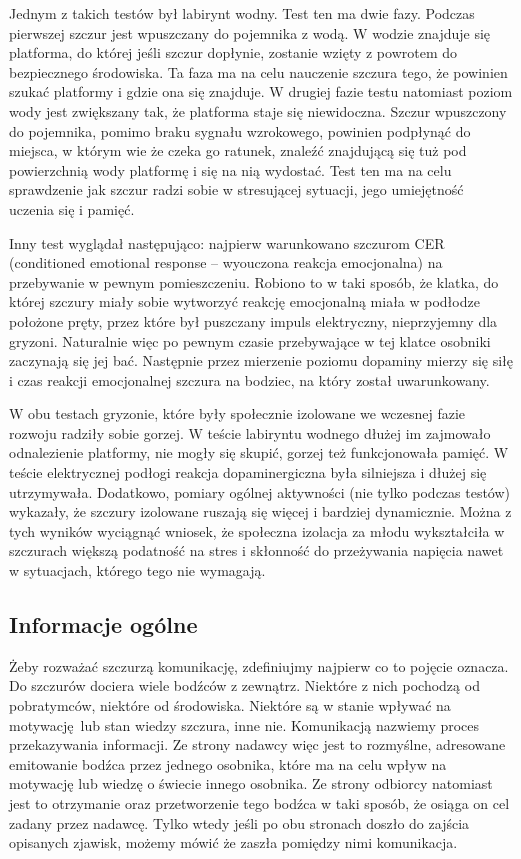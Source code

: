 \documentclass{psychol}
\begin{document}
Jednym z takich testów był labirynt wodny. Test ten ma dwie fazy. Podczas pierwszej szczur jest wpuszczany do pojemnika z wodą. W wodzie znajduje się platforma, do której jeśli szczur dopłynie, zostanie wzięty z powrotem do bezpiecznego środowiska. Ta faza ma na celu nauczenie szczura tego, że powinien szukać platformy i gdzie ona się znajduje. W drugiej fazie testu natomiast poziom wody jest zwiększany tak, że platforma staje się niewidoczna. Szczur wpuszczony do pojemnika, pomimo braku sygnału wzrokowego, powinien podpłynąć do miejsca, w którym wie że czeka go ratunek, znaleźć znajdującą się tuż pod powierzchnią wody platformę i się na nią wydostać. Test ten ma na celu sprawdzenie jak szczur radzi sobie w stresującej sytuacji, jego umiejętność uczenia się i pamięć.

Inny test wyglądał następująco: najpierw warunkowano szczurom CER (conditioned emotional response -- wyouczona reakcja emocjonalna) na przebywanie w pewnym pomieszczeniu. Robiono to w taki sposób, że klatka, do której szczury miały sobie wytworzyć reakcję emocjonalną miała w podłodze położone pręty, przez które był puszczany impuls elektryczny, nieprzyjemny dla gryzoni. Naturalnie więc po pewnym czasie przebywające w tej klatce osobniki zaczynają się jej bać. Następnie przez mierzenie poziomu dopaminy mierzy się siłę i czas reakcji emocjonalnej szczura na bodziec, na który został uwarunkowany.

W obu testach gryzonie, które były społecznie izolowane we wczesnej fazie rozwoju radziły sobie gorzej. W teście labiryntu wodnego dłużej im zajmowało odnalezienie platformy, nie mogły się skupić, gorzej też funkcjonowała pamięć. W teście elektrycznej podłogi reakcja dopaminergiczna była silniejsza i dłużej się utrzymywała. Dodatkowo, pomiary ogólnej aktywności (nie tylko podczas testów) wykazały, że szczury izolowane ruszają się więcej i bardziej dynamicznie. Można z tych wyników wyciągnąć wniosek, że społeczna izolacja za młodu wykształciła w szczurach większą podatność na stres i skłonność do przeżywania napięcia nawet w sytuacjach, którego tego nie wymagają.


\subsection{Informacje ogólne}

Żeby rozważać szczurzą komunikację, zdefiniujmy najpierw co to pojęcie oznacza. Do szczurów dociera wiele bodźców z zewnątrz. Niektóre z nich pochodzą od pobratymców, niektóre od środowiska. Niektóre są w stanie wpływać na motywację lub stan wiedzy szczura, inne nie. Komunikacją nazwiemy proces przekazywania informacji. Ze strony nadawcy więc jest to rozmyślne, adresowane emitowanie bodźca przez jednego osobnika, które ma na celu wpływ na motywację lub wiedzę o świecie innego osobnika. Ze strony odbiorcy natomiast jest to otrzymanie oraz przetworzenie tego bodźca w taki sposób, że osiąga on cel zadany przez nadawcę. Tylko wtedy jeśli po obu stronach doszło do zajścia opisanych zjawisk, możemy mówić że zaszła pomiędzy nimi komunikacja.
\end{document}
